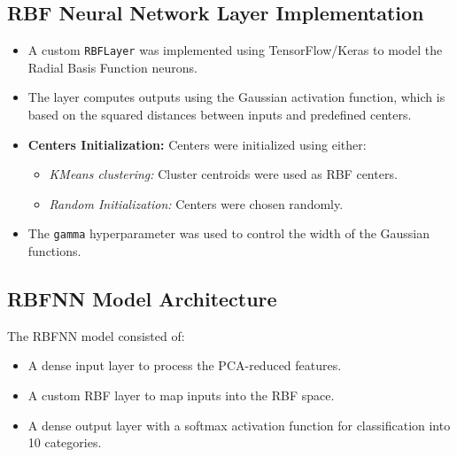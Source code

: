 \documentclass[lettersize,journal]{IEEEtran}
\begin{document}
\subsection{\textbf{RBF Neural Network Layer Implementation}}
\begin{itemize}
    \item A custom \texttt{RBFLayer} was implemented using TensorFlow/Keras to model the Radial Basis Function neurons.
    \item The layer computes outputs using the Gaussian activation function, which is based on the squared distances between inputs and predefined centers.
    \item \textbf{Centers Initialization:}
    Centers were initialized using either:
    \begin{itemize}
        \item \textit{KMeans clustering:} Cluster centroids were used as RBF centers.
        \item \textit{Random Initialization:} Centers were chosen randomly.
    \end{itemize}
    \item The \texttt{gamma} hyperparameter was used to control the width of the Gaussian functions.
\end{itemize}

\subsection{\textbf{RBFNN Model Architecture}}
The RBFNN model consisted of:
\begin{itemize}
    \item A dense input layer to process the PCA-reduced features.
    \item A custom RBF layer to map inputs into the RBF space.
    \item A dense output layer with a softmax activation function for classification into 10 categories.
\end{itemize}
\end{document}
